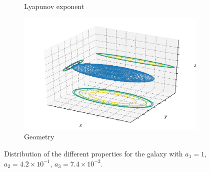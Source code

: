 \begin{figure}[h]
\begin{subfigure}[t]{0.4\textwidth}
        \caption{Lyapunov exponent}
    \end{subfigure}
    \begin{subfigure}[t]{0.4\textwidth}
        \includegraphics[width=\textwidth]{"../Files/Week 13/images/9_ellipsoid"}
        \caption{Geometry}
    \end{subfigure}
    \caption{Distribution of the different properties for the galaxy with $a_1 = 1$, $a_2 = 4.2\times10^{-1}$, $a_3 = 7.4\times10^{-2}$.}
    \label{fig: g14}
\end{figure}



